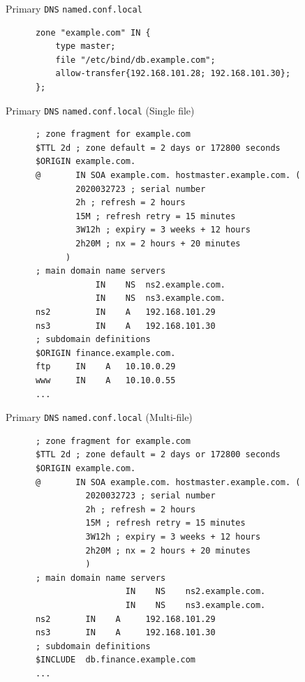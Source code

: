 \documentclass[xcolor=table,aspectratio=169]{beamer}
\begin{document}
\begin{frame}[fragile]{Primary \texttt{DNS} \texttt{named.conf.local}}
  \begin{tcolorbox}
    \lstset{
      basicstyle=\tiny\ttfamily,
    }
    \begin{lstlisting}
      zone "example.com" IN {
	      type master;
	      file "/etc/bind/db.example.com";
	      allow-transfer{192.168.101.28; 192.168.101.30};
      };
    \end{lstlisting}
  \end{tcolorbox}
\end{frame}

\begin{frame}[fragile]{Primary \texttt{DNS} \texttt{named.conf.local} (Single file)}
  \begin{tcolorbox}
    \lstset{
      basicstyle=\tiny\ttfamily,
    }
    \begin{lstlisting}
      ; zone fragment for example.com
      $TTL 2d ; zone default = 2 days or 172800 seconds
      $ORIGIN example.com.
      @	      IN SOA example.com. hostmaster.example.com. (
	          2020032723 ; serial number
	          2h ; refresh = 2 hours
	          15M ; refresh retry = 15 minutes
	          3W12h ; expiry = 3 weeks + 12 hours
	          2h20M ; nx = 2 hours + 20 minutes
            )
      ; main domain name servers
		          IN    NS 	ns2.example.com.
		          IN    NS 	ns3.example.com.
      ns2 		  IN    A 	192.168.101.29
      ns3 		  IN    A 	192.168.101.30
      ; subdomain definitions
      $ORIGIN finance.example.com.
      ftp     IN    A   10.10.0.29
      www     IN    A   10.10.0.55
      ...
    \end{lstlisting}
  \end{tcolorbox}
\end{frame}

\begin{frame}[fragile]{Primary \texttt{DNS} \texttt{named.conf.local} (Multi-file)}
  \begin{tcolorbox}
    \lstset{
      basicstyle=\tiny\ttfamily,
    }
    \begin{lstlisting}
      ; zone fragment for example.com
      $TTL 2d ; zone default = 2 days or 172800 seconds
      $ORIGIN example.com.
      @	      IN SOA example.com. hostmaster.example.com. (
                2020032723 ; serial number
                2h ; refresh = 2 hours
                15M ; refresh retry = 15 minutes
                3W12h ; expiry = 3 weeks + 12 hours
                2h20M ; nx = 2 hours + 20 minutes
                )
      ; main domain name servers
                        IN    NS 	ns2.example.com.
                        IN    NS 	ns3.example.com.
      ns2 		IN    A 	192.168.101.29
      ns3 		IN    A 	192.168.101.30
      ; subdomain definitions
      $INCLUDE	db.finance.example.com
      ...
    \end{lstlisting}
  \end{tcolorbox}
\end{frame}
\end{document}
